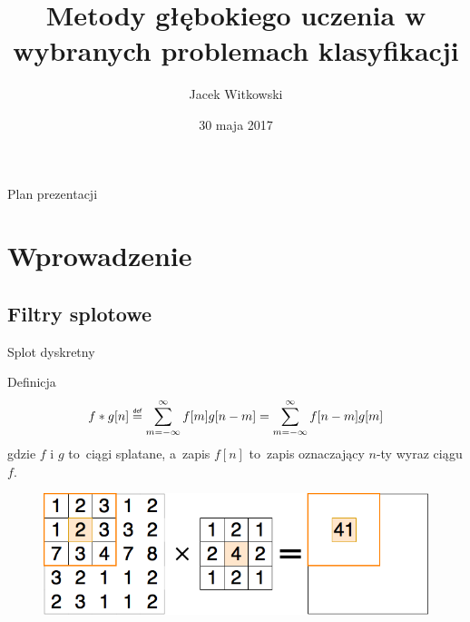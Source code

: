 \documentclass[xcolor=dvipsnames]{beamer}
\title[Obrona pracy dyplomowej]{Metody głębokiego uczenia w wybranych problemach klasyfikacji}
\subtitle[]{}
\author[J. Witkowski]{Jacek Witkowski}
\institute[Instytut Informatyki]{
  PW EiTI \\
  Instytut Informatyki \\
  promotor: mgr inż.~Rajmund Kożuszek
}
\date[Maj 2017]{30 maja 2017}
\newcommand\defeq{\mathrel{\overset{\makebox[0pt]{\mbox{\normalfont\tiny\sffamily def}}}{=}}}
\begin{document}
\begin{frame}[plain]
  \titlepage
\end{frame}

\begin{frame}{Plan prezentacji}
  \tableofcontents
\end{frame}


\section{Wprowadzenie}
\subsection{Filtry splotowe}
\begin{frame}{Splot dyskretny}
    \begin{block}{Definicja}
        \begin{equation*}
            f\ast g[n]\defeq \sum\limits_{m=-\infty}^{\infty}f[m]g[n-m] = \sum\limits_{m=-\infty}^{\infty}f[n-m]g[m]
        \end{equation*}
        gdzie $f$ i $g$ to~ciągi splatane, a~zapis $f[n]$ to~zapis oznaczający $n$-ty wyraz ciągu $f$.
    \end{block}
    \begin{figure}
		\includegraphics[width=\linewidth, keepaspectratio] {img/convolutional_filter.png}
	\end{figure}
\end{frame}
\end{document}
